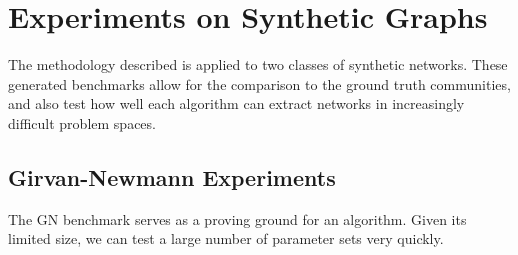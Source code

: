 \chapter{Experiments on Synthetic Graphs}

The methodology described is applied to two classes of synthetic networks. These generated benchmarks allow for the comparison to the ground truth communities, and also test how well each algorithm can extract networks in increasingly difficult problem spaces.

\section{Girvan-Newmann Experiments}
The GN benchmark serves as a proving ground for an algorithm. Given its limited size, we can test a large number of parameter sets very quickly. 





